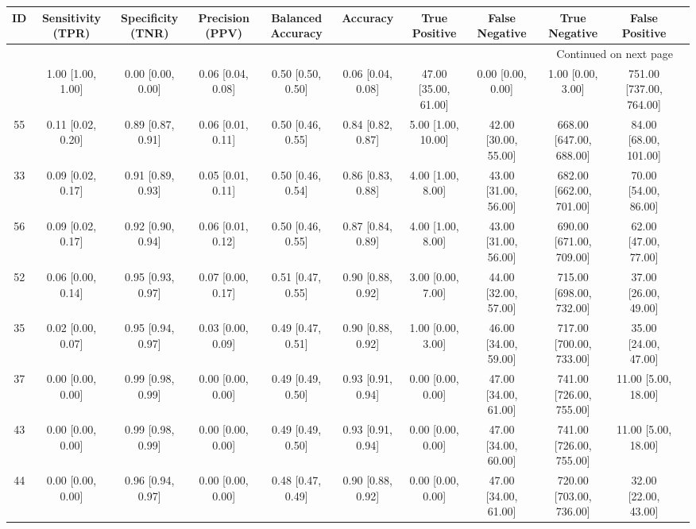 \documentclass[8pt]{article}
\begin{document}
\begin{center}
\begin{footnotesize}
\begin{longtable}{|ccccccccccc|}
\toprule
 ID &  Sensitivity (TPR) &  Specificity (TNR) &    Precision (PPV) &  Balanced Accuracy &           Accuracy &         True Positive &        False Negative &            True Negative &           False Positive \\
\midrule
\endhead
\midrule
\multicolumn{10}{r}{{Continued on next page}} \\
\midrule
\endfoot

\bottomrule
\endlastfoot
 38 &  1.00 [1.00, 1.00] &  0.00 [0.00, 0.00] &  0.06 [0.04, 0.08] &  0.50 [0.50, 0.50] &  0.06 [0.04, 0.08] &  47.00 [35.00, 61.00] &     0.00 [0.00, 0.00] &        1.00 [0.00, 3.00] &  751.00 [737.00, 764.00] \\
 55 &  0.11 [0.02, 0.20] &  0.89 [0.87, 0.91] &  0.06 [0.01, 0.11] &  0.50 [0.46, 0.55] &  0.84 [0.82, 0.87] &    5.00 [1.00, 10.00] &  42.00 [30.00, 55.00] &  668.00 [647.00, 688.00] &    84.00 [68.00, 101.00] \\
 33 &  0.09 [0.02, 0.17] &  0.91 [0.89, 0.93] &  0.05 [0.01, 0.11] &  0.50 [0.46, 0.54] &  0.86 [0.83, 0.88] &     4.00 [1.00, 8.00] &  43.00 [31.00, 56.00] &  682.00 [662.00, 701.00] &     70.00 [54.00, 86.00] \\
 56 &  0.09 [0.02, 0.17] &  0.92 [0.90, 0.94] &  0.06 [0.01, 0.12] &  0.50 [0.46, 0.55] &  0.87 [0.84, 0.89] &     4.00 [1.00, 8.00] &  43.00 [31.00, 56.00] &  690.00 [671.00, 709.00] &     62.00 [47.00, 77.00] \\
 52 &  0.06 [0.00, 0.14] &  0.95 [0.93, 0.97] &  0.07 [0.00, 0.17] &  0.51 [0.47, 0.55] &  0.90 [0.88, 0.92] &     3.00 [0.00, 7.00] &  44.00 [32.00, 57.00] &  715.00 [698.00, 732.00] &     37.00 [26.00, 49.00] \\
 35 &  0.02 [0.00, 0.07] &  0.95 [0.94, 0.97] &  0.03 [0.00, 0.09] &  0.49 [0.47, 0.51] &  0.90 [0.88, 0.92] &     1.00 [0.00, 3.00] &  46.00 [34.00, 59.00] &  717.00 [700.00, 733.00] &     35.00 [24.00, 47.00] \\
 37 &  0.00 [0.00, 0.00] &  0.99 [0.98, 0.99] &  0.00 [0.00, 0.00] &  0.49 [0.49, 0.50] &  0.93 [0.91, 0.94] &     0.00 [0.00, 0.00] &  47.00 [34.00, 61.00] &  741.00 [726.00, 755.00] &      11.00 [5.00, 18.00] \\
 43 &  0.00 [0.00, 0.00] &  0.99 [0.98, 0.99] &  0.00 [0.00, 0.00] &  0.49 [0.49, 0.50] &  0.93 [0.91, 0.94] &     0.00 [0.00, 0.00] &  47.00 [34.00, 60.00] &  741.00 [726.00, 755.00] &      11.00 [5.00, 18.00] \\
 44 &  0.00 [0.00, 0.00] &  0.96 [0.94, 0.97] &  0.00 [0.00, 0.00] &  0.48 [0.47, 0.49] &  0.90 [0.88, 0.92] &     0.00 [0.00, 0.00] &  47.00 [34.00, 61.00] &  720.00 [703.00, 736.00] &     32.00 [22.00, 43.00] \\
\end{longtable}
\end{footnotesize}
\end{center}
\end{document}
